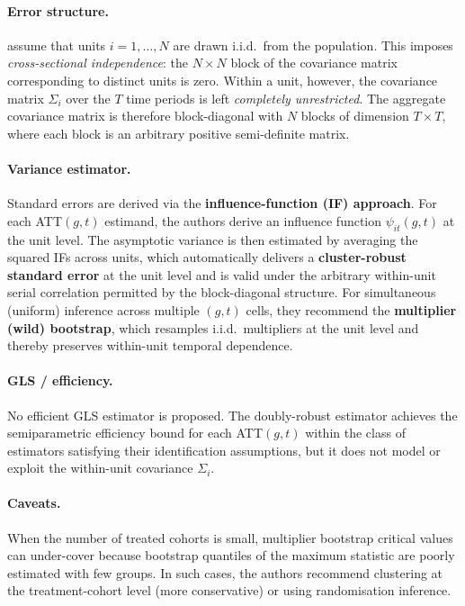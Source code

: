 \documentclass[12pt]{article}
\begin{document}
\paragraph{Error structure.}
\citet{callaway2021difference} assume that units $i = 1, \ldots, N$ are drawn
i.i.d.\ from the population.
This imposes \textit{cross-sectional independence}: the $N \times N$ block of the
covariance matrix corresponding to distinct units is zero.
Within a unit, however, the covariance matrix $\Sigma_i$ over the $T$ time periods
is left \textit{completely unrestricted}.
The aggregate covariance matrix is therefore block-diagonal with $N$ blocks of
dimension $T \times T$, where each block is an arbitrary positive semi-definite
matrix.

\paragraph{Variance estimator.}
Standard errors are derived via the \textbf{influence-function (IF) approach}.
For each ATT$(g,t)$ estimand, the authors derive an influence function
$\psi_{it}(g,t)$ at the unit level.
The asymptotic variance is then estimated by averaging the squared IFs across
units, which automatically delivers a \textbf{cluster-robust standard error}
at the unit level and is valid under the arbitrary within-unit serial
correlation permitted by the block-diagonal structure.
For simultaneous (uniform) inference across multiple $(g,t)$ cells, they
recommend the \textbf{multiplier (wild) bootstrap}, which resamples i.i.d.\
multipliers at the unit level and thereby preserves within-unit temporal
dependence.

\paragraph{GLS / efficiency.}
No efficient GLS estimator is proposed.
The doubly-robust estimator achieves the semiparametric efficiency bound for
each ATT$(g,t)$ within the class of estimators satisfying their identification
assumptions, but it does not model or exploit the within-unit covariance
$\Sigma_i$.

\paragraph{Caveats.}
When the number of treated cohorts is small, multiplier bootstrap critical values
can under-cover because bootstrap quantiles of the maximum statistic are poorly
estimated with few groups.
In such cases, the authors recommend clustering at the treatment-cohort level
(more conservative) or using randomisation inference.
\end{document}
